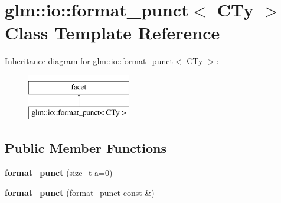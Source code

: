 \hypertarget{classglm_1_1io_1_1format__punct}{\section{glm\-:\-:io\-:\-:format\-\_\-punct$<$ C\-Ty $>$ Class Template Reference}
\label{classglm_1_1io_1_1format__punct}
}
Inheritance diagram for glm\-:\-:io\-:\-:format\-\_\-punct$<$ C\-Ty $>$\-:\begin{figure}[H]
\begin{center}
\leavevmode
\includegraphics[height=2.000000cm]{classglm_1_1io_1_1format__punct}
\end{center}
\end{figure}
\subsection*{Public Member Functions}
\begin{DoxyCompactItemize}
\item 
\hypertarget{classglm_1_1io_1_1format__punct_ac9d5253f96b74c5fb0097251693188a9}{{\bfseries format\-\_\-punct} (size\-\_\-t a=0)}\label{classglm_1_1io_1_1format__punct_ac9d5253f96b74c5fb0097251693188a9}

\item 
\hypertarget{classglm_1_1io_1_1format__punct_a2fbfad17f266020af68fd679cb70e991}{{\bfseries format\-\_\-punct} (\hyperlink{classglm_1_1io_1_1format__punct}{format\-\_\-punct} const \&)}\label{classglm_1_1io_1_1format__punct_a2fbfad17f266020af68fd679cb70e991}

\end{DoxyCompactItemize}
